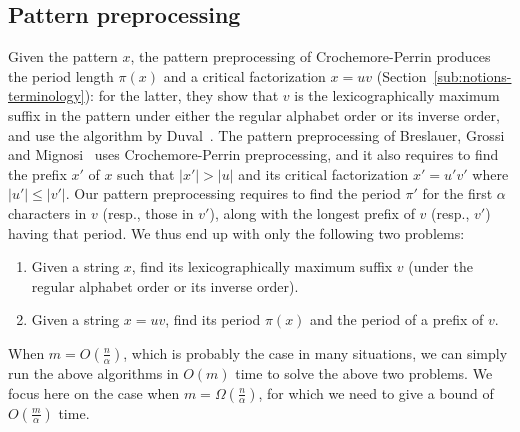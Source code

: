 \documentclass[12pt]{article}
\newcommand{\C}{{\alpha}}
\newcommand{\wssm}{\textsc{wssm}}
\begin{document}
\subsection{Pattern preprocessing}
\label{sub:prepro}

Given the pattern $x$, the pattern preprocessing of Crochemore-Perrin
produces the period length $\pi(x)$ and a critical factorization
$x=uv$ (Section~\ref{sub:notions-terminology}): for the latter, they
show that $v$ is the lexicographically maximum suffix in the pattern
under either the regular alphabet order or its inverse order, and use
the algorithm by Duval~\cite{du:83}.  The pattern preprocessing of
Breslauer, Grossi and Mignosi~\cite{bgm:11} uses Crochemore-Perrin
preprocessing, and it also requires to find the prefix $x'$ of $x$
such that $|x'|> |u|$ and its critical factorization $x'=u'v'$ where
$|u'| \leq |v'|$.
%
Our pattern preprocessing requires to
find the period $\pi'$ for the first $\C$ characters in $v$ (resp.,
those in $v'$), along with the longest prefix of $v$ (resp., $v'$)
having that period. 
We thus end up with only the following two problems:
\begin{enumerate}
\item Given a string $x$, find its lexicographically maximum suffix
  $v$ (under the regular alphabet order or its inverse order).
\item Given a string $x = uv$, find its period $\pi(x)$ and the period
  of a prefix of $v$.
\end{enumerate}

When $m = O(\frac{n}{\C})$, which is probably the case in many
situations, we can simply run the above algorithms in $O(m)$ time to
solve the above two problems. We focus here on the case when $m =
\Omega(\frac{n}{\C})$, for which we need to give a bound of
$O(\frac{m}{\C})$ time.
\end{document}
